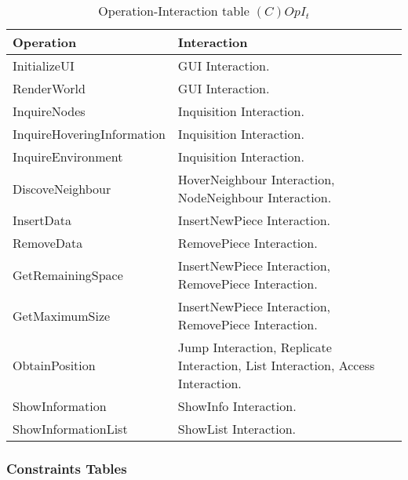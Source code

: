 \begin{table}[H]
	\centering
	\begin{tabular}{|p{5cm}|p{7cm}|}
			\hline
			\textbf{Operation} & \textbf{Interaction} \\
			\hline
			InitializeUI & GUI Interaction. \\
			\hline
			RenderWorld & GUI Interaction. \\
			\hline
			InquireNodes & Inquisition Interaction. \\
			\hline
			InquireHoveringInformation & Inquisition Interaction. \\
			\hline
			InquireEnvironment & Inquisition Interaction. \\
			\hline
			DiscoveNeighbour & HoverNeighbour Interaction, NodeNeighbour Interaction. \\
			\hline
			InsertData & InsertNewPiece Interaction. \\
			\hline
			RemoveData &  RemovePiece Interaction. \\
			\hline
			GetRemainingSpace & InsertNewPiece Interaction, RemovePiece Interaction.  \\
			\hline
			GetMaximumSize & InsertNewPiece Interaction, RemovePiece Interaction.  \\
			\hline
			ObtainPosition & Jump Interaction, Replicate Interaction, List
			Interaction, Access Interaction.  \\
			\hline
			ShowInformation & ShowInfo Interaction.  \\
			\hline
			ShowInformationList & ShowList Interaction.  \\
			\hline
		\end{tabular}
	\caption{Operation-Interaction table $(C)OpI_t$}
	\label{tab:opit}
\end{table}

\subsubsection{Constraints Tables}

